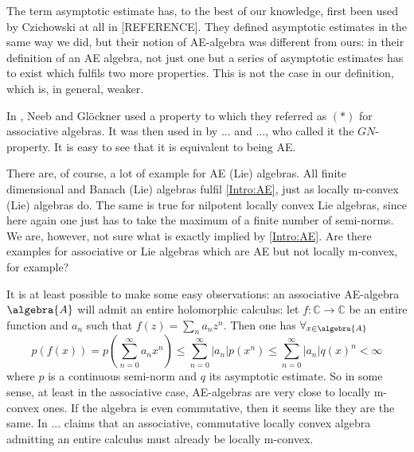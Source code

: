 \begin{remark}
	\label{rem:AE2}
	\mbox{}
	\begin{remarklist}
		\item
		The term asymptotic estimate has, to the best of our knowledge, 
		first been used by Czichowski at all in [REFERENCE]. They 
		defined asymptotic estimates in the same way we did, but their 
		notion of AE-algebra was different from ours: in their 
		definition of an AE algebra, not just one but a series of 
		asymptotic estimates has to exist which fulfils two more 
		properties. This is not the case in our definition, which is, in 
		general, weaker.
		
		\item
		In \cite{}, Neeb and Gl\"ockner used a property to which they 
		referred as $(*)$ for associative algebras. It was then used in 
		\cite{} by ... and ..., who called it the $GN$-property. It is 
		easy to see that it is equivalent to being AE. 
		
		\item
		There are, of course, a lot of example for AE (Lie) algebras. 
		All finite dimensional and Banach (Lie) algebras fulfil 
		\eqref{Intro:AE}, just as locally m-convex (Lie) algebras do. 
		The same is true for nilpotent locally convex Lie algebras, 
		since here again one just has to take the maximum of a finite 
		number of semi-norms. We are, however, not sure what is exactly 
		implied by \eqref{Intro:AE}. Are there examples for associative 
		or Lie algebras which are AE but not locally m-convex, for 
		example?
	\end{remarklist}
\end{remark}
It is at least possible to make some easy observations: an associative 
AE-algebra $\algebra{A}$ will admit an entire holomorphic calculus: let 
$f \colon \mathbb{C} \longrightarrow \mathbb{C}$ be an entire function 
and $a_n$ such that $f(z) = \sum_n a_n z^n$. Then one has 
$\forall_{x \in \algebra{A}}$
\begin{equation*}
	p(f(x))
	=
	p \left(
		\sum\limits_{n=0}^{\infty}
		a_n x^n
	\right)
	\leq
	\sum\limits_{n=0}^{\infty}
	|a_n| 
	p \left( x^n \right)
	\leq
	\sum\limits_{n=0}^{\infty}
	|a_n| q(x)^n
	<
	\infty
\end{equation*}
where $p$ is a continuous semi-norm and $q$ its asymptotic estimate. So 
in some sense, at least in the associative case, AE-algebras are very 
close to locally m-convex ones. If the algebra is even commutative, then 
it seems like they are the same. In \cite{} ... claims that an 
associative, commutative locally convex algebra admitting an entire 
calculus must already be locally m-convex.

